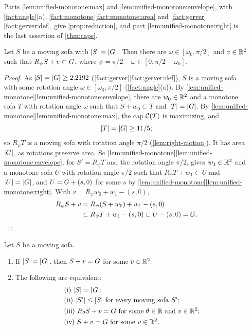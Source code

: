 Parts \ref{lem:unified-monotone:max} and \ref{lem:unified-monotone:envelope},
with \cref{fact:angle}(a), \cref{fact:monotone}\ref{fact:monotone:area} and
\cref{fact:gerver}\ref{fact:gerver:def}, give \cref{prop:reduction}, and part
\ref{lem:unified-monotone:right} is the last assertion of \cref{thm:caps}.

\begin{proposition}\label{prop:unified-contained}
Let $S$ be a moving sofa with $\lvert S\rvert=\lvert G\rvert$. Then there are
$\omega\in[\omega_0,\pi/2]$ and $v\in\mathbb{R}^2$ such that $R_\psi S+v\subset G$,
where $\psi=\pi/2-\omega\in[0,\pi/2-\omega_0]$.
\end{proposition}

\begin{proof}
As $\lvert S\rvert=\lvert G\rvert\ge2.2192$ (\cref{fact:gerver}\ref{fact:gerver:def}), $S$ is a
moving sofa with some rotation angle $\omega\in[\omega_0,\pi/2]$
(\cref{fact:angle}(a)). By
\cref{lem:unified-monotone}\ref{lem:unified-monotone:envelope}, there are
$w_0\in\mathbb{R}^2$ and a monotone sofa $T$ with rotation angle $\omega$ such that
$S+w_0\subset T$ and $\lvert T\rvert=\lvert G\rvert$. By
\cref{lem:unified-monotone}\ref{lem:unified-monotone:max}, the cap $\mathcal{C}(T)$ is
maximizing, and
\[
  \lvert T\rvert=\lvert G\rvert\ge11/5;
\]
so $R_\psi T$ is a moving sofa with rotation angle $\pi/2$
(\cref{lem:right-motion}). It has area $\lvert G\rvert$, as rotations preserve area. So
\cref{lem:unified-monotone}\ref{lem:unified-monotone:envelope}, for
$S'=R_\psi T$ and the rotation angle $\pi/2$, gives $w_1\in\mathbb{R}^2$ and a monotone
sofa $U$ with rotation angle $\pi/2$ such that $R_\psi T+w_1\subset U$ and
$\lvert U\rvert=\lvert G\rvert$, and $U=G+(s,0)$ for some $s$ by
\cref{lem:unified-monotone}\ref{lem:unified-monotone:right}. With
$v=R_\psi w_0+w_1-(s,0)$,
\begin{align*}
  R_\psi S+v&=R_\psi(S+w_0)+w_1-(s,0)\\
    &\subset R_\psi T+w_1-(s,0)\subset U-(s,0)=G .\qedhere
\end{align*}
\end{proof}

\begin{theorem}\label{thm:unified-uniqueness}
Let $S$ be a moving sofa.
\begin{enumerate}[label=(\alph*)]
\item\label{thm:unified-uniqueness:translate} If $\lvert S\rvert=\lvert G\rvert$, then
$S+v=G$ for some $v\in\mathbb{R}^2$.
\item\label{thm:unified-uniqueness:equiv} The following are equivalent:
\begin{align*}
  &\text{(i)}~\lvert S\rvert=\lvert G\rvert;\\
  &\text{(ii)}~\lvert S'\rvert\le\lvert S\rvert\text{ for every moving sofa }S';\\
  &\text{(iii)}~R_\theta S+v=G\text{ for some }\theta\in\mathbb{R}\text{ and }
    v\in\mathbb{R}^2;\\
  &\text{(iv)}~S+v=G\text{ for some }v\in\mathbb{R}^2.
\end{align*}
\end{enumerate}
\end{theorem}

